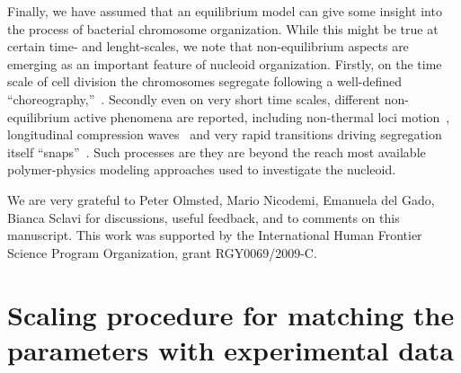 \documentclass[
preprint,
a4paper,
12pt,
superscriptaddress,
pre]{revtex4}
\begin{document}
Finally, we have assumed that an equilibrium model can give some
insight into the process of bacterial chromosome organization. While
this might be true at certain time- and lenght-scales, we note that
non-equilibrium aspects are emerging as an important feature of
nucleoid organization.  Firstly, on the time scale of cell division
the chromosomes segregate following a well-defined
``choreography,''~\cite{Youngren2014,Fisher2013,Kuwada2013,Toro2010}.
%
Secondly even on very short time scales, different non-equilibrium
active phenomena are reported, including non-thermal loci
motion~\cite{Weber2012a}, longitudinal compression
waves~\cite{Fisher2013} and very rapid transitions driving segregation
itself ``snaps''~\cite{Fisher2013,Joshi2011,EMB08}.  Such processes
are they are beyond the reach most available polymer-physics modeling
approaches used to investigate the nucleoid.





\begin{acknowledgments}
  We are very grateful to Peter Olmsted, Mario Nicodemi, Emanuela del
  Gado, Bianca Sclavi
  for discussions, useful feedback, and to
  comments on this manuscript.  This work was supported by the
  International Human Frontier Science Program Organization, grant
  RGY0069/2009-C.
\end{acknowledgments}



    


\appendix

\section{Scaling procedure for matching the parameters with
  experimental data}
\end{document}
